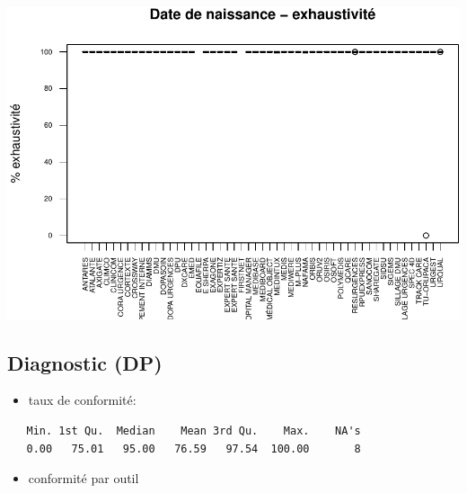 \documentclass[]{article}
\begin{document}
\includegraphics{septembre2015_files/figure-latex/unnamed-chunk-16-1.pdf}

\subsection{Diagnostic (DP)}\label{diagnostic-dp}

\begin{itemize}
\itemsep1pt\parskip0pt
\item
  taux de conformité:
\end{itemize}

\begin{verbatim}
   Min. 1st Qu.  Median    Mean 3rd Qu.    Max.    NA's 
   0.00   75.01   95.00   76.59   97.54  100.00       8 
\end{verbatim}

\begin{itemize}
\itemsep1pt\parskip0pt
\item
  conformité par outil
\end{itemize}
\end{document}
